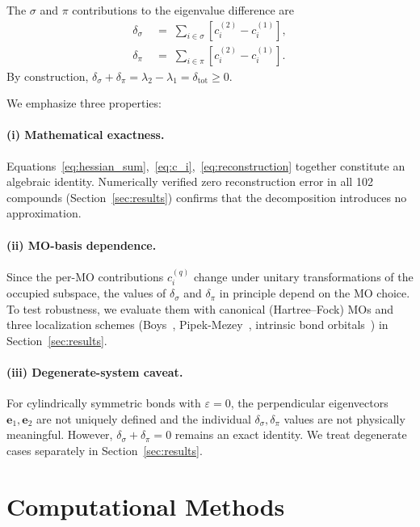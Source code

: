 \documentclass[twoside,natbib]{svjour3}
\newcommand{\delsg}{\delta_{\sigma}}
\newcommand{\delpi}{\delta_{\pi}}
\newcommand{\eps}{\varepsilon}
\begin{document}
The $\sigma$ and $\pi$ contributions to the eigenvalue difference are
\begin{align}
\delsg &\;=\; \sum_{i \in \sigma} \!\left[c_i^{(2)} - c_i^{(1)}\right],
\label{eq:delta_sigma} \\
\delpi &\;=\; \sum_{i \in \pi} \!\left[c_i^{(2)} - c_i^{(1)}\right].
\label{eq:delta_pi}
\end{align}
By construction,
$\delsg + \delpi = \lambda_2 - \lambda_1 = \delta_{\text{tot}} \ge 0$.

We emphasize three properties:

\paragraph{(i) Mathematical exactness.} 
Equations~\ref{eq:hessian_sum},~\ref{eq:c_i},~\ref{eq:reconstruction}
together constitute an algebraic identity. Numerically verified
zero reconstruction error in all 102 compounds (Section~\ref{sec:results})
confirms that the decomposition introduces no approximation.

\paragraph{(ii) MO-basis dependence.}
Since the per-MO contributions $c_i^{(q)}$ change under unitary
transformations of the occupied subspace, the values of $\delsg$
and $\delpi$ in principle depend on the MO choice. To test
robustness, we evaluate them with canonical (Hartree--Fock)
MOs and three localization schemes
(Boys~\citep{Boys1960},
Pipek-Mezey~\citep{Pipek1989},
intrinsic bond orbitals~\citep{Knizia2013}) in
Section~\ref{sec:results}.

\paragraph{(iii) Degenerate-system caveat.}
For cylindrically symmetric bonds with $\eps = 0$, the perpendicular
eigenvectors $\mathbf{e}_1, \mathbf{e}_2$ are not uniquely defined and
the individual $\delsg, \delpi$ values are not physically meaningful.
However, $\delsg + \delpi = 0$ remains an exact identity. We treat
degenerate cases separately in Section~\ref{sec:results}.

\section{Computational Methods}
\label{sec:methods}
\end{document}
